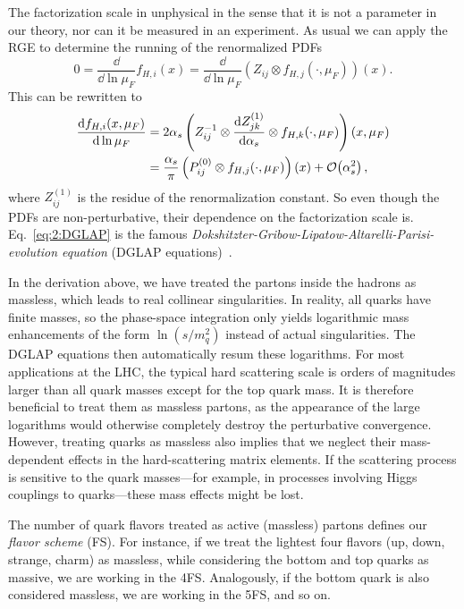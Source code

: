 The factorization scale in unphysical in the sense that it is not a parameter in our theory, nor can it be measured in an experiment. As usual we can apply the \acs{RGE} to determine the running of the renormalized \acs{PDF}s
\begin{equation}
0 = \frac{\dd}{\dd \ln \mu_F} f_{H,i}(x) = \frac{\dd}{\dd \ln \mu_F} (Z_{ij} \otimes f_{H, j}(\cdot, \mu_F))(x).
\end{equation}
This can be rewritten to
\begin{equation}
\begin{split}
\frac{\mathrm{d} f_{H,i}(x, \mu_F)}{\mathrm{d} \ln \mu_F} &=  2 \alpha_s \left(Z_{ij}^{-1} \otimes \frac{\mathrm{d} Z_{jk}^{(1)}}{\mathrm{d} \alpha_s} \otimes f_{H,k}(\cdot, \mu_F) \right)(x, \mu_F) \\
&= \frac{\alpha_s}{\pi} \left(P_{ij}^{(0)} \otimes f_{H,j}(\cdot, \mu_F) \right)(x) + \mathcal{O}\!\left(\alpha_s^2\right),
\label{eq:2:DGLAP}
\end{split}
\end{equation}
where $Z^{(1)}_{ij}$ is the residue of the renormalization constant. So even though the \acs{PDF}s are non-perturbative, their dependence on the factorization scale is. Eq.~\eqref{eq:2:DGLAP} is the famous \textit{Dokshitzter-Gribow-Lipatow-Altarelli-Parisi-evolution equation} (DGLAP equations)~\cite{Dokshitzer:1977sg,Gribov:1972ri,Altarelli:1977zs}.

In the derivation above, we have treated the partons inside the hadrons as massless, which leads to real collinear singularities. In reality, all quarks have finite masses, so the phase-space integration only yields logarithmic mass enhancements of the form $\ln (s/m_q^2)$ instead of actual singularities. The DGLAP equations then automatically resum these logarithms. For most applications at the \acs{LHC}, the typical hard scattering scale is orders of magnitudes larger than all quark masses except for the top quark mass. It is therefore beneficial to treat them as massless partons, as the appearance of the large logarithms would otherwise completely destroy the perturbative convergence. However, treating quarks as massless also implies that we neglect their mass-dependent effects in the hard-scattering matrix elements. If the scattering process is sensitive to the quark masses---for example, in processes involving Higgs couplings to quarks---these mass effects might be lost.

The number of quark flavors treated as active (massless) partons defines our \textit{flavor scheme} (\acs{FS}). For instance, if we treat the lightest four flavors (up, down, strange, charm) as massless, while considering the bottom and top quarks as massive, we are working in the 4\acs{FS}. Analogously, if the bottom quark is also considered massless, we are working in the 5\acs{FS}, and so on.


